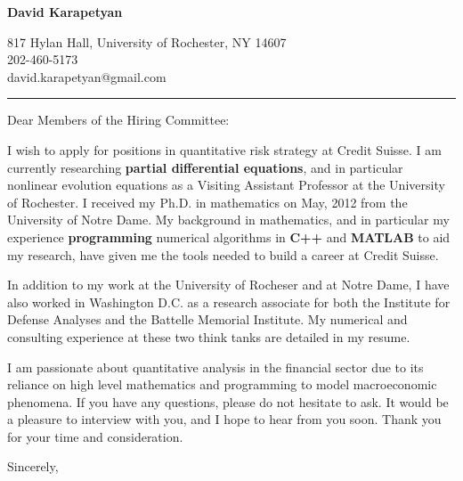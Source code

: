 \documentclass[12pt]{letter}
\date{\vspace{0.5cm}\flushleft}
\begin{document}
\begin{letter}{}
\begin{center}
{\bf {\Large David Karapetyan}}
\end{center}

\begin{center}
{817 Hylan Hall, University of Rochester, NY 14607  \\ 
202-460-5173 \\  david.karapetyan@gmail.com
}
\end{center}
\hrule

\opening{Dear Members of the Hiring Committee:\\}
%
%
I wish to apply for positions in quantitative risk strategy at Credit Suisse. I am currently researching \textbf{partial differential equations}, and in particular nonlinear evolution equations as a Visiting Assistant Professor at the University of Rochester. I received my Ph.D. in mathematics on May, 2012 from the University of Notre Dame. My
background in mathematics, and in particular my experience
\textbf{programming} numerical algorithms in \textbf{C++} and \textbf{MATLAB}
to aid my research, have given me the tools needed to build a career at Credit Suisse.

In addition to my work at the University of Rocheser and at Notre Dame, I have also worked in Washington D.C. as a research
associate for both the Institute for Defense Analyses and the Battelle Memorial
Institute. My numerical and consulting experience at these two think tanks are
detailed in my resume. 

I am passionate about quantitative analysis in the financial sector due to its reliance on high level mathematics and programming to model macroeconomic phenomena. If you have any questions, please do not hesitate to ask. It would be a
pleasure to interview with you, and I hope to hear from you soon. Thank you for
your time and consideration. 

\closing{Sincerely,}


\end{letter}
\end{document}
